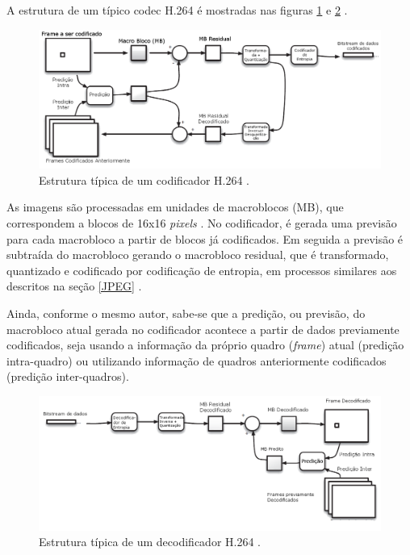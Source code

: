 A estrutura de um típico codec H.264 é mostradas nas figuras \ref{H264_ENCODER} e \ref{H264_DECODER} \cite{richardson2011h}.

\begin{figure}[h]
	\centering
	\includegraphics[scale=0.45]{figuras/H264_CODIFICADOR.png}
	\caption{Estrutura típica de um codificador H.264 \cite{richardson2011h}.}
	\label{H264_ENCODER}
\end{figure}

As imagens são processadas em unidades de macroblocos (MB), que correspondem a blocos de 16x16 \textit{pixels} \cite{richardson2011h}. No codificador, é gerada uma previsão para cada macrobloco a partir de blocos já codificados. Em seguida a previsão é subtraída do macrobloco gerando o macrobloco residual, que é transformado, quantizado e codificado por codificação de entropia, em processos similares aos descritos na seção \ref{JPEG} .

Ainda, conforme o mesmo autor, sabe-se que a predição, ou previsão, do macrobloco atual gerada no codificador acontece a partir de dados previamente codificados, seja usando a informação da próprio quadro (\textit{frame}) atual (predição intra-quadro) ou utilizando informação de quadros anteriormente codificados (predição inter-quadros).
  
\begin{figure}[h]
	\centering
	\includegraphics[scale=0.45]{figuras/H264_DECODIFICADOR.png}
	\caption{Estrutura típica de um decodificador H.264 \cite{richardson2011h}.}
	\label{H264_DECODER}
\end{figure}

